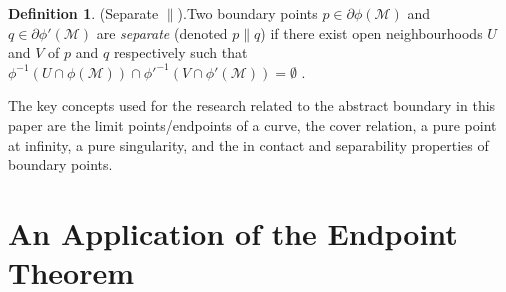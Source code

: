 \documentclass[pdflatex,sn-mathphys-num]{sn-jnl}
\theoremstyle{definition}
\newtheorem{defn}[theorem]{Definition}
\begin{document}
\begin{defn}(Separate $\parallel$).\label{defn:separated}
    Two boundary points $p \in \partial\phi(\mathcal{M})$ and $q \in \partial\phi'(\mathcal{M})$ are \emph{separate} (denoted $p \parallel q$) if there exist open neighbourhoods $U$ and $V$ of $p$ and $q$ respectively such that $\phi^{-1}(U \cap \phi(\mathcal{M})) \cap \phi'^{-1}(V \cap \phi'(\mathcal{M})) = \emptyset$ .
\end{defn}

The key concepts used for the research related to the abstract boundary in this paper are the limit points/endpoints of a curve, the cover relation, a pure point at infinity, a pure singularity, and the in contact and separability properties of boundary points.
 
\section{An Application of the Endpoint Theorem}\label{section 3}
\end{document}
